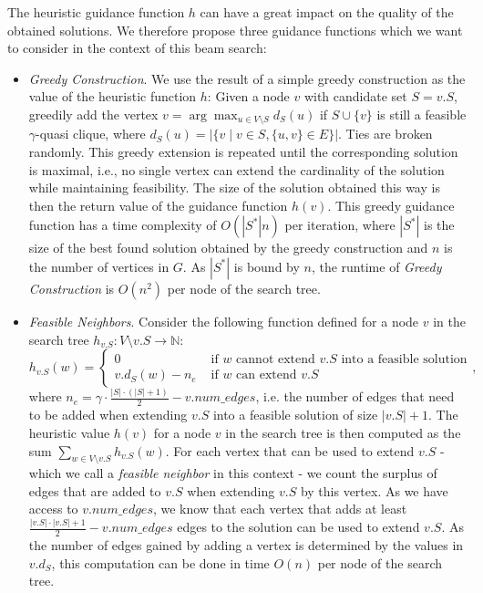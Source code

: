 \documentclass[draft,final]{vutinfth} %
\begin{document}
The heuristic guidance function $h$ can have a great impact on the quality of the obtained solutions. We therefore propose three guidance functions which we want to consider in the context of this beam search: 
\begin{itemize}
    \item \emph{Greedy Construction}. We use the result of a simple greedy construction as the value of the heuristic function $h$: Given a node $v$ with candidate set $S = v.S$, greedily add the vertex $v = \arg \max_{u \in V \setminus S} d_S(u)$ if $S \cup \{v\}$ is still a feasible $\gamma$-quasi clique, where $d_S(u) = |\{v \mid v \in S, \{u,v\} \in E \}|$. 
    Ties are broken randomly. This greedy extension is repeated until the corresponding solution is maximal, i.e., no single vertex can extend the cardinality of the solution while maintaining feasibility. 
    The size of the solution obtained this way is then the return value of the guidance function $h(v)$. This greedy guidance function has a time complexity of $O(|S^*|n)$ per iteration, where $|S^*|$ is the size of the best found solution obtained by the greedy construction and $n$ is the number of vertices in $G$. As $|S^*|$ is bound by $n$, the runtime of \emph{Greedy Construction} is $O(n^2)$ per node of the search tree. 
    \item \emph{Feasible Neighbors}. Consider the following function defined for a node $v$ in the search tree $h_{v.S} \colon V \setminus v.S \rightarrow \mathbb{N}$: 
    \[
        h_{v.S}(w) = 
        \begin{cases}
            0 & \text{ if $w$ cannot extend $v.S$ into a feasible solution}\\
            \mathit{v.d_S}(w) - n_e & \text{ if $w$ can extend $v.S$ }
        \end{cases},
    \]
    where $n_e = \gamma \cdot \frac{|S|\cdot (|S|+1)}{2} - \mathit{v.num\_edges}$, i.e. the number of edges that need to be added when extending $\mathit{v.S}$ into a feasible solution of size $|\mathit{v.S}|+1$. 
    The heuristic value $h(v)$ for a node $v$ in the search tree is then computed as the sum $\sum_{w \in V \setminus v.S} h_{v.S}(w)$. 
    For each vertex that can be used to extend $v.S$ - which we call a \emph{feasible neighbor} in this context - we count the surplus of edges that are added to $v.S$ when extending $v.S$ by this vertex. As we have access to $\mathit{v.num\_edges}$, we know that each vertex that adds at least $\frac{|\mathit{v.S}|\cdot|\mathit{v.S}|+1}{2} - \mathit{v.num\_edges}$ edges to the solution can be used to extend $\mathit{v.S}$. As the number of edges gained by adding a vertex is determined by the values in $\mathit{v.d_S}$, this computation can be done in time $O(n)$ per node of the search tree. 

\end{itemize}
\end{document}
